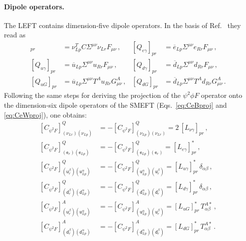 \paragraph{Dipole operators.}
The LEFT contains dimension-five dipole operators. In the basis of Ref.~\cite{Jenkins:2017jig} they read as
\begin{align}
    [Q_{\nu\gamma}]_{pr} &= \nu_{Lp}^TC\Sigma^{\mu\nu}\nu_{Lr}F_{\mu\nu}\,,
    &
    [Q_{e\gamma}]_{pr} &= \overline e_{Lp}\Sigma^{\mu\nu}e_{Rr}F_{\mu\nu}\,,
    \\
    [Q_{u\gamma}]_{pr} &= \overline u_{Lp}\Sigma^{\mu\nu}u_{Rr}F_{\mu\nu}\,,
    &
    [Q_{d\gamma}]_{pr} &= \overline d_{Lp}\Sigma^{\mu\nu}d_{Rr}F_{\mu\nu}\,,
    \\
    [Q_{uG}]_{pr} &= \overline u_{Lp}\Sigma^{\mu\nu}T^A u_{Rr}G^A_{\mu\nu}\,,
    &
    [Q_{dG}]_{pr} &= \overline d_{Lp}\Sigma^{\mu\nu}T^A d_{Rr}G^A_{\mu\nu}\,.
\end{align}
Following the same steps for deriving the projection of the $\psi^2\phi F$ operator onto the dimension-six dipole operators of the SMEFT (Eqs.~\eqref{eq:CeBproj} and \eqref{eq:CeWproj}), one obtains:
\begin{align}
    \left[C_{\psi^2 F}\right]^Q_{(\nu_{Lr})(\nu_{Lp})} &= -\left[C_{\psi^2 F}\right]^Q_{(\nu_{Lp})(\nu_{Lr})} = 2\,[L_{\nu\gamma}]_{pr}\,,
    \\
    \left[C_{\psi^2 F}\right]^Q_{(\mathsf e_r)(\mathsf e_{Lp})} &= -\left[C_{\psi^2 F}\right]^Q_{(\mathsf e_{Lp})(\mathsf e_r)} = [L_{e\gamma}]_{pr}^*\,,
    \\
    \left[C_{\psi^2 F}\right]^Q_{(\mathsf u^\beta_r)(\mathsf u^\alpha_{Lp})} &= -\left[C_{\psi^2 F}\right]^Q_{(\mathsf u^\alpha_{Lp})(\mathsf u^\beta_r)} = [L_{u\gamma}]_{pr}^*\,\delta_{\alpha\beta}\,,
    \\
    \left[C_{\psi^2 F}\right]^Q_{(\mathsf d^\beta_r)(\mathsf d^\alpha_{Lp})} &= -\left[C_{\psi^2 F}\right]^Q_{(\mathsf d^\alpha_{Lp})(\mathsf d^\beta_r)} = [L_{d\gamma}]_{pr}^*\,\delta_{\alpha\beta}\,,
    \\
    \left[C_{\psi^2 F}\right]^A_{(\mathsf u^\beta_r)(\mathsf u^\alpha_{Lp})} &= -\left[C_{\psi^2 F}\right]^A_{(\mathsf u^\alpha_{Lp})(\mathsf u^\beta_r)} = [L_{uG}]_{pr}^*\,T^{A*}_{\alpha\beta}\,,
    \\
    \left[C_{\psi^2 F}\right]^A_{(\mathsf d^\beta_r)(\mathsf d^\alpha_{Lp})} &= -\left[C_{\psi^2 F}\right]^A_{(\mathsf d^\alpha_{Lp})(\mathsf d^\beta_r)} = [L_{dG}]_{pr}^*\,T^{A*}_{\alpha\beta}\,.
\end{align}

